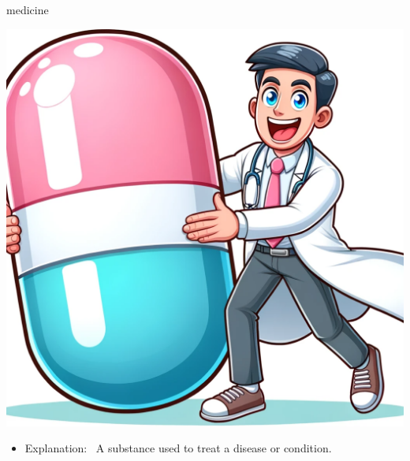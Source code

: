 \documentclass[avery5371, grid,frame]{flashcards}
\begin{document}
\renewcommand{\cardpaper}{a4paper}
\renewcommand{\cardpapermode}{landscape}
\renewcommand{\cardrows}{2}
\renewcommand{\cardcolumns}{2}
\setlength{\cardheight}{3.5in}
\setlength{\cardwidth}{5.0in}
\setlength{\topoffset}{0.65in}
\setlength{\oddoffset}{0.65in}
\setlength{\evenoffset}{0.65in}

\begin{flashcard}{medicine}
    \vspace*{\fill}
    \begin{center}
        \begin{minipage}[c]{.45\textwidth}
            \includegraphics[width=\textwidth]{cards/m/medicine/medicine - a doctor holding a giant pill, ready to administer it.png}
        \end{minipage}
        \begin{minipage}[c]{.45\textwidth}
            \begin{itemize}\setlength\itemsep{12pt}
            \item Explanation: \ A substance used to treat a disease or condition.


\end{itemize}
\end{minipage}
\end{center}
\end{flashcard}
\end{document}
